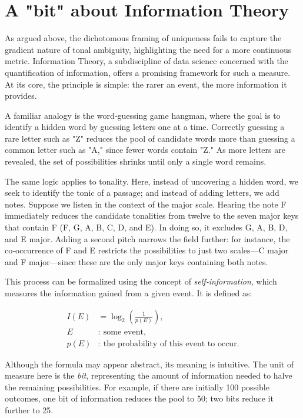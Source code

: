 \documentclass[10pt,twocolumn]{article}
\numberwithin{equation}{section} %
\begin{document}
    \section{A "bit" about Information Theory}

    As argued above, the dichotomous framing of uniqueness fails to capture the gradient nature of tonal ambiguity, highlighting the need for a more continuous metric.
    Information Theory, a subdiscipline of data science concerned with the quantification of information\citep{shannon1948}, offers a promising framework for such a measure.
    At its core, the principle is simple: the rarer an event, the more information it provides.

    A familiar analogy is the word‑guessing game hangman, where the goal is to identify a hidden word by guessing letters one at a time.
    Correctly guessing a rare letter such as "Z" reduces the pool of candidate words more than guessing a common letter such as "A," since fewer words contain "Z."
    As more letters are revealed, the set of possibilities shrinks until only a single word remains.

    The same logic applies to tonality.
    Here, instead of uncovering a hidden word, we seek to identify the tonic of a passage; and instead of adding letters, we add notes.
    Suppose we listen in the context of the major scale.
    Hearing the note F immediately reduces the candidate tonalities from twelve to the seven major keys that contain F (F, G\text{$\flat$}, A\text{$\flat$}, B\text{$\flat$}, C, D\text{$\flat$}, and E\text{$\flat$}).
    In doing so, it excludes G, A, B, D, and E major.
    Adding a second pitch narrows the field further: for instance, the co‑occurrence of F and E restricts the possibilities to just two scales—C major and F major—since these are the only major keys containing both notes.

    This process can be formalized using the concept of \textit{self}\textit{‑}\textit{information}, which measures the information gained from a given event.
    It is defined as:

    \begin{align}
        I(E) &= \log_{2} \left( \frac{1}{p(E)} \right), \\
        E &:\ \text{some event}, \\
        p(E) &:\ \text{the probability of this event to occur}.
    \end{align}


    Although the formula may appear abstract, its meaning is intuitive.
    The unit of measure here is the \textit{bit}, representing the amount of information needed to halve the remaining possibilities.
    For example, if there are initially 100 possible outcomes, one bit of information reduces the pool to 50; two bits reduce it further to 25.
\end{document}
